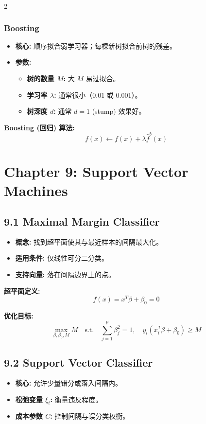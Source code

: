\documentclass[6pt,a4paper]{ctexart}
\begin{document}
\begin{multicols}{2}
\subsubsection*{Boosting}
\begin{itemize}
    \item \textbf{核心:} 顺序拟合弱学习器；每棵新树拟合前树的残差。
    \item \textbf{参数:}
    \begin{itemize}
        \item \textbf{树的数量 $M$:} 大 $M$ 易过拟合。
        \item \textbf{学习率 $\lambda$:} 通常很小（0.01 或 0.001）。
        \item \textbf{树深度 $d$:} 通常 $d=1$ (stump) 效果好。
    \end{itemize}
\end{itemize}

\textbf{Boosting (回归) 算法:}
$$ f(x) \leftarrow f(x) + \lambda \hat{f}^{b}(x) $$

\section*{Chapter 9: Support Vector Machines}

\subsection*{9.1 Maximal Margin Classifier}
\begin{itemize}
    \item \textbf{概念:} 找到超平面使其与最近样本的间隔最大化。
    \item \textbf{适用条件:} 仅线性可分二分类。
    \item \textbf{支持向量:} 落在间隔边界上的点。
\end{itemize}

\textbf{超平面定义:}
$$ f(x) = x^{T}\beta + \beta_{0} = 0 $$

\textbf{优化目标:}
$$ \max_{\beta, \beta_{0}, M} M \quad \text{s.t.} \quad \sum_{j=1}^{p} \beta_{j}^{2} = 1, \quad y_{i}(x_{i}^{T}\beta + \beta_{0}) \ge M $$

\subsection*{9.2 Support Vector Classifier}
\begin{itemize}
    \item \textbf{核心:} 允许少量错分或落入间隔内。
    \item \textbf{松弛变量 $\xi_i$:} 衡量违反程度。
    \item \textbf{成本参数 $C$:} 控制间隔与误分类权衡。
\end{itemize}


\end{multicols}
\end{document}
